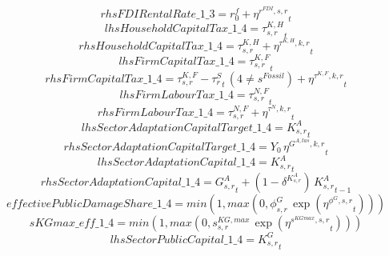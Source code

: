 \begin{dmath*}
rhsFDIRentalRate\_1\_3 = {{r^f_0}}+{{\eta^{r^{FDI},s,r}}}_{t}
\end{dmath*}
\begin{dmath*}
lhsHouseholdCapitalTax\_1\_4 = {{\tau^{K,H}_{s,r}}}_{t}
\end{dmath*}
\begin{dmath*}
rhsHouseholdCapitalTax\_1\_4 = {{\tau^{K,H}_{s,r}}}+{{\eta^{\tau^{K,H},k,r}}}_{t}
\end{dmath*}
\begin{dmath*}
lhsFirmCapitalTax\_1\_4 = {{\tau^{K,F}_{s,r}}}_{t}
\end{dmath*}
\begin{dmath*}
rhsFirmCapitalTax\_1\_4 = {{\tau^{K,F}_{s,r}}}-{{\tau^{S}_{r}}}_{t}\, \left(4\neq {{s^{Fossil}}}\right)+{{\eta^{\tau^{K,F},k,r}}}_{t}
\end{dmath*}
\begin{dmath*}
lhsFirmLabourTax\_1\_4 = {{\tau^{N,F}_{s,r}}}_{t}
\end{dmath*}
\begin{dmath*}
rhsFirmLabourTax\_1\_4 = {{\tau^{N,F}_{s,r}}}+{{\eta^{\tau^{N},k,r}}}_{t}
\end{dmath*}
\begin{dmath*}
lhsSectorAdaptationCapitalTarget\_1\_4 = {{K^{A}_{s,r}}}_{t}
\end{dmath*}
\begin{dmath*}
rhsSectorAdaptationCapitalTarget\_1\_4 = {{Y_0}}\, {{\eta^{G^{A,tas},k,r}}}_{t}
\end{dmath*}
\begin{dmath*}
lhsSectorAdaptationCapital\_1\_4 = {{K^{A}_{s,r}}}_{t}
\end{dmath*}
\begin{dmath*}
rhsSectorAdaptationCapital\_1\_4 = {{G^{A}_{s,r}}}_{t}+\left(1-{{\delta^{K^{A}_{s,r}}}}\right)\, {{K^{A}_{s,r}}}_{t-1}
\end{dmath*}
\begin{dmath*}
effectivePublicDamageShare\_1\_4 = min(1,max(0,{{\phi^{G}_{s,r}}}\, \exp\left({{\eta^{\phi^{G},s,r}}}_{t}\right)))
\end{dmath*}
\begin{dmath*}
sKGmax\_eff\_1\_4 = min(1,max(0,{{s^{KG,max}_{s,r}}}\, \exp\left({{\eta^{s^{KGmax},s,r}}}_{t}\right)))
\end{dmath*}
\begin{dmath*}
lhsSectorPublicCapital\_1\_4 = {{K^G_{s,r}}}_{t}
\end{dmath*}
